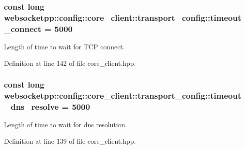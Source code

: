 \subsubsection[{timeout\+\_\+connect}]{\setlength{\rightskip}{0pt plus 5cm}const long websocketpp\+::config\+::core\+\_\+client\+::transport\+\_\+config\+::timeout\+\_\+connect = 5000\hspace{0.3cm}{\ttfamily [static]}}\label{structwebsocketpp_1_1config_1_1core__client_1_1transport__config_ab5516b1f6e73f0e7e3b66ec6cb759a94}


Length of time to wait for T\+C\+P connect. 



Definition at line 142 of file core\+\_\+client.\+hpp.

\hypertarget{structwebsocketpp_1_1config_1_1core__client_1_1transport__config_a098e6e8b47221d461c5cbaf46897b185}{}
\subsubsection[{timeout\+\_\+dns\+\_\+resolve}]{\setlength{\rightskip}{0pt plus 5cm}const long websocketpp\+::config\+::core\+\_\+client\+::transport\+\_\+config\+::timeout\+\_\+dns\+\_\+resolve = 5000\hspace{0.3cm}{\ttfamily [static]}}\label{structwebsocketpp_1_1config_1_1core__client_1_1transport__config_a098e6e8b47221d461c5cbaf46897b185}


Length of time to wait for dns resolution. 



Definition at line 139 of file core\+\_\+client.\+hpp.

\hypertarget{structwebsocketpp_1_1config_1_1core__client_1_1transport__config_ab03c89468c0af9b6285ae467b8436a98}{}
